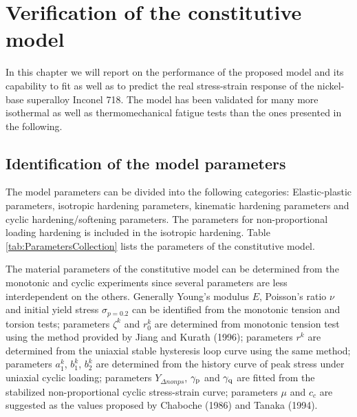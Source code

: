 \chapter{Verification of the constitutive model}

In this chapter we will report on the performance of the proposed model and its capability to fit as well as to predict the real stress-strain response of the nickel-base superalloy Inconel 718.
The model has been validated for many more isothermal as well as thermomechanical fatigue tests than the ones presented in the following.

\section{Identification of the model parameters}
The model parameters can be divided into the following categories: Elastic-plastic parameters, isotropic hardening parameters, kinematic hardening parameters and cyclic hardening/softening parameters. The parameters for non-proportional loading hardening is included in the isotropic hardening.
Table \ref{tab:ParametersCollection} lists the parameters of the constitutive model.

The material parameters of the constitutive model can be determined from the monotonic and cyclic experiments since several parameters are less interdependent on the others.
Generally Young's modulus $E$, Poisson's ratio $\nu$ and initial yield stress $\sigma_{p=0.2}$ can be identified from the monotonic tension and torsion tests;
parameters $\zeta^k$ and $r_0^k$ are determined from monotonic tension test using the method provided by Jiang and Kurath (1996)\cite{Jiang1996387};
parameters $r^k$ are determined from the uniaxial stable hysteresis loop curve using the same method;
parameters $a_1^k$, $b_1^k$, $b_2^k$ are determined from the history curve of peak stress under uniaxial cyclic loading;
parameters $Y_{\Delta nonps}$, $\gamma_{\rm{p}}$ and $\gamma_{\rm{q}}$ are fitted from the stabilized non-proportional cyclic stress-strain curve;
parameters $\mu$ and $c_c$ are suggested as the values proposed by Chaboche (1986)\cite{Chaboche1986149} and Tanaka (1994)\cite{tanaka1994nonproportionality}.

